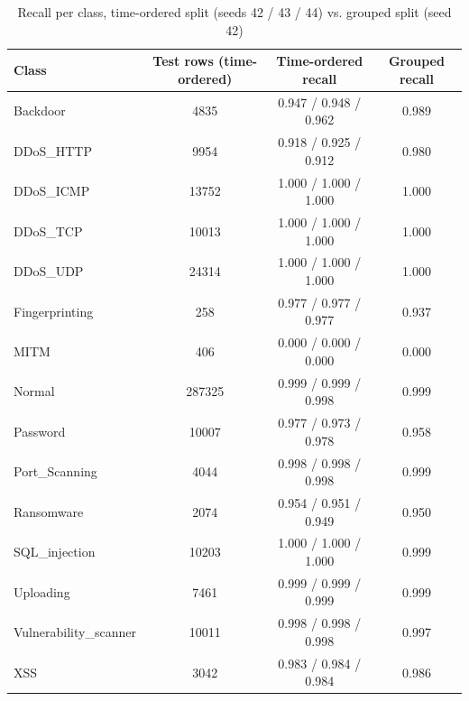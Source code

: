 \begin{table}[H]
\centering
\small
\setlength{\tabcolsep}{3pt}
\renewcommand{\arraystretch}{1.15}
\begin{tabular}{|l|c|c|c|}
\hline
\textbf{Class} & \textbf{Test rows (time-ordered)} & \textbf{Time-ordered recall} & \textbf{Grouped recall} \\ \hline
Backdoor & 4835 & 0.947 / 0.948 / 0.962 & 0.989 \\ \hline
DDoS\_HTTP & 9954 & 0.918 / 0.925 / 0.912 & 0.980 \\ \hline
DDoS\_ICMP & 13752 & 1.000 / 1.000 / 1.000 & 1.000 \\ \hline
DDoS\_TCP & 10013 & 1.000 / 1.000 / 1.000 & 1.000 \\ \hline
DDoS\_UDP & 24314 & 1.000 / 1.000 / 1.000 & 1.000 \\ \hline
Fingerprinting & 258 & 0.977 / 0.977 / 0.977 & 0.937 \\ \hline
MITM & 406 & 0.000 / 0.000 / 0.000 & 0.000 \\ \hline
Normal & 287325 & 0.999 / 0.999 / 0.998 & 0.999 \\ \hline
Password & 10007 & 0.977 / 0.973 / 0.978 & 0.958 \\ \hline
Port\_Scanning & 4044 & 0.998 / 0.998 / 0.998 & 0.999 \\ \hline
Ransomware & 2074 & 0.954 / 0.951 / 0.949 & 0.950 \\ \hline
SQL\_injection & 10203 & 1.000 / 1.000 / 1.000 & 0.999 \\ \hline
Uploading & 7461 & 0.999 / 0.999 / 0.999 & 0.999 \\ \hline
Vulnerability\_scanner & 10011 & 0.998 / 0.998 / 0.998 & 0.997 \\ \hline
XSS & 3042 & 0.983 / 0.984 / 0.984 & 0.986 \\ \hline
\end{tabular}
\caption{Recall per class, time-ordered split (seeds 42 / 43 / 44) vs. grouped split (seed 42)}
\label{tab:fu_temporal_classes}
\end{table}

